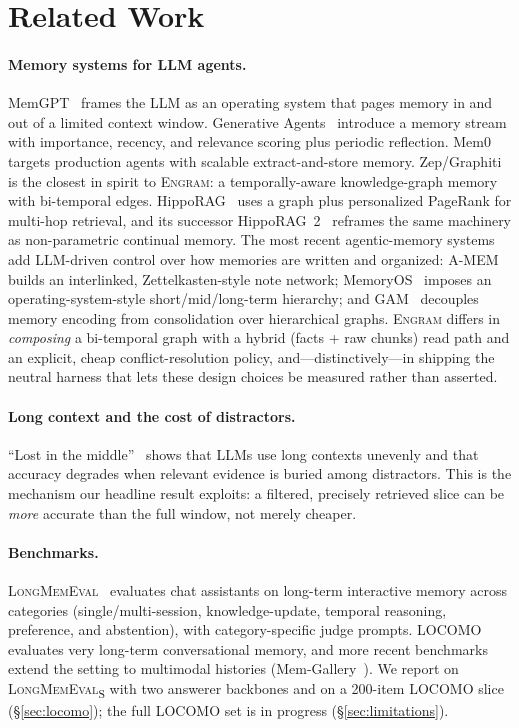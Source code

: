 \documentclass{article}
\newcommand{\engram}{\textsc{Engram}}
\begin{document}
\section{Related Work}

\paragraph{Memory systems for LLM agents.}
MemGPT~\citep{packer2023memgpt} frames the LLM as an operating system that pages memory in and out of a
limited context window. Generative Agents~\citep{park2023generative} introduce a memory stream with
importance, recency, and relevance scoring plus periodic reflection. Mem0~\citep{chhikara2025mem0} targets
production agents with scalable extract-and-store memory. Zep/Graphiti~\citep{rasmussen2025zep} is the closest
in spirit to \engram{}: a temporally-aware knowledge-graph memory with bi-temporal edges.
HippoRAG~\citep{gutierrez2024hipporag} uses a graph plus personalized PageRank for multi-hop retrieval, and
its successor HippoRAG~2~\citep{gutierrez2025hipporag2} reframes the same machinery as non-parametric continual
memory. The most recent agentic-memory systems add LLM-driven control over how memories are written and
organized: A-MEM~\citep{xu2025amem} builds an interlinked, Zettelkasten-style note network;
MemoryOS~\citep{kang2025memoryos} imposes an operating-system-style short/mid/long-term hierarchy; and
GAM~\citep{wu2026gam} decouples memory encoding from consolidation over hierarchical graphs. \engram{} differs in
\emph{composing} a bi-temporal graph with a hybrid (facts + raw chunks) read path and an explicit, cheap
conflict-resolution policy, and---distinctively---in shipping the neutral harness that lets these design
choices be measured rather than asserted.

\paragraph{Long context and the cost of distractors.}
``Lost in the middle''~\citep{liu2024lost} shows that LLMs use long contexts unevenly and that accuracy
degrades when relevant evidence is buried among distractors. This is the mechanism our headline result
exploits: a filtered, precisely retrieved slice can be \emph{more} accurate than the full window, not merely
cheaper.

\paragraph{Benchmarks.}
\textsc{LongMemEval}~\citep{wu2025longmemeval} evaluates chat assistants on long-term interactive memory
across categories (single/multi-session, knowledge-update, temporal reasoning, preference, and abstention),
with category-specific judge prompts. LOCOMO~\citep{maharana2024locomo} evaluates very long-term
conversational memory, and more recent benchmarks extend the setting to multimodal histories
(Mem-Gallery~\citep{bei2026memgallery}). We report on \textsc{LongMemEval}\textsubscript{S} with two answerer
backbones and on a 200-item LOCOMO slice (\S\ref{sec:locomo}); the full LOCOMO set is in progress
(\S\ref{sec:limitations}).
\end{document}
